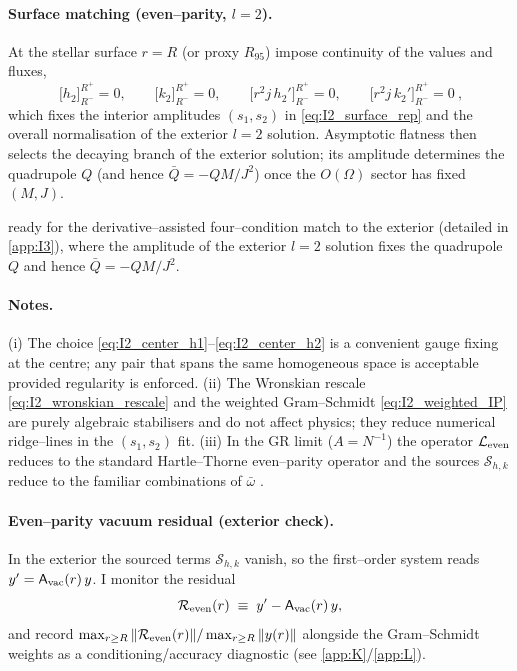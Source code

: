 \documentclass{iopjournal}
\begin{document}
\paragraph{Surface matching (even--parity, $l=2$).}
At the stellar surface $r=R$ (or proxy $R_{95}$) impose continuity of the values and fluxes,
\begin{equation}
\boxed{\
\big[h_2\big]_{R^-}^{R^+}=0,\qquad
\big[k_2\big]_{R^-}^{R^+}=0,\qquad
\big[r^{2}j\,h_2'\big]_{R^-}^{R^+}=0,\qquad
\big[r^{2}j\,k_2'\big]_{R^-}^{R^+}=0\ ,
}
\label{eq:I2_match_conditions}
\end{equation}
which fixes the interior amplitudes $(s_1,s_2)$ in \eqref{eq:I2_surface_rep} and the overall normalisation of the exterior $l=2$ solution. Asymptotic flatness then selects the decaying branch of the exterior solution; its amplitude determines the quadrupole $Q$ (and hence $\bar{Q}=-QM/J^2$) once the $O(\Omega)$ sector has fixed $(M,J)$.

ready for the derivative–assisted four–condition match to the exterior (detailed in \cref{app:I3}), where the amplitude of the exterior $l=2$ solution fixes the quadrupole $Q$ and hence $\bar{Q}=-QM/J^{2}$.

\paragraph{Notes.}
(i) The choice \eqref{eq:I2_center_h1}–\eqref{eq:I2_center_h2} is a convenient gauge fixing at the centre; any pair that spans the same homogeneous space is acceptable provided regularity is enforced. (ii) The Wronskian rescale \eqref{eq:I2_wronskian_rescale} and the weighted Gram–Schmidt \eqref{eq:I2_weighted_IP} are purely algebraic stabilisers and do not affect physics; they reduce numerical ridge–lines in the $(s_1,s_2)$ fit. (iii) In the GR limit ($A=N^{-1}$) the operator $\mathcal L_{\rm even}$ reduces to the standard Hartle–Thorne even–parity operator and the sources $\mathcal S_{h,k}$ reduce to the familiar combinations of $\bar\omega$ \cite{Hartle1967,HartleThorne1968,PoissonWill2014}.
\paragraph{Even--parity vacuum residual (exterior check).}
In the exterior the sourced terms $\mathcal S_{h,k}$ vanish, so the first--order system reads $y'=\mathsf A_{\rm vac}(r)\,y$. I monitor the residual
\begin{equation}
\mathcal R_{\rm even}(r)\;\equiv\;y'-\mathsf A_{\rm vac}(r)\,y,
\label{eq:I2_even_residual}
\end{equation}
and record $\max_{r\ge R}\|\mathcal R_{\rm even}(r)\|/\max_{r\ge R}\|y(r)\|$ alongside the Gram--Schmidt weights as a conditioning/accuracy diagnostic (see \cref{app:K}/\cref{app:L}).
\end{document}
